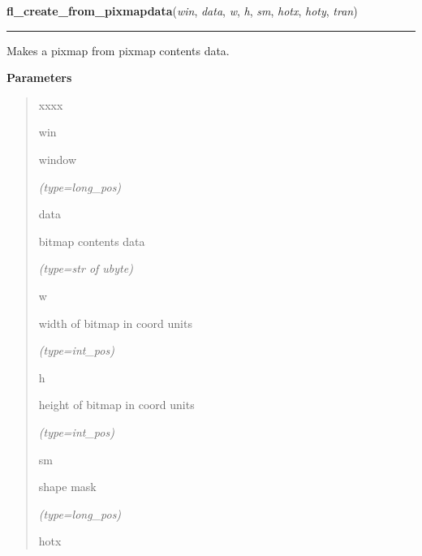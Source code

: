     \label{xformslib:flbitmap:fl_create_from_pixmapdata}

    \vspace{0.5ex}

\hspace{.8\funcindent}\begin{boxedminipage}{\funcwidth}

    \raggedright \textbf{fl\_create\_from\_pixmapdata}(\textit{win}, \textit{data}, \textit{w}, \textit{h}, \textit{sm}, \textit{hotx}, \textit{hoty}, \textit{tran})

    \vspace{-1.5ex}

    \rule{\textwidth}{0.5\fboxrule}
\setlength{\parskip}{2ex}
    Makes a pixmap from pixmap contents data.

\setlength{\parskip}{1ex}
      \textbf{Parameters}
      \vspace{-1ex}

      \begin{quote}
        \begin{Ventry}{xxxx}

          \item[win]

          window

            {\it (type=long\_pos)}

          \item[data]

          bitmap contents data

            {\it (type=str of ubyte)}

          \item[w]

          width of bitmap in coord units

            {\it (type=int\_pos)}

          \item[h]

          height of bitmap in coord units

            {\it (type=int\_pos)}

          \item[sm]

          shape mask

            {\it (type=long\_pos)}

          \item[hotx]


\end{Ventry}
\end{quote}
\end{boxedminipage}
